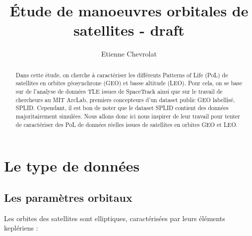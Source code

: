\documentclass{article}
\title{Étude de manoeuvres orbitales de satellites - draft}
\author{Etienne Chevrolat}
\date{}
\begin{document}
\maketitle

\begin{abstract}
    Dans cette étude, on cherche à caractériser les différents Patterns of Life (PoL) de satellites en orbites géosynchrone (GEO) et basse altitude (LEO).
    Pour cela, on se base sur de l'analyse de données TLE issues de SpaceTrack ainsi que sur le travail de chercheurs au MIT ArcLab, premiers concepteurs d'un dataset public GEO labellisé, SPLID.
    Cependant, il est bon de noter que le dataset SPLID contient des données majoritairement simulées. Nous allons donc ici nous inspirer de leur travail pour tenter de caractériser des PoL de données réelles issues de satellites en orbites GEO et LEO.
\end{abstract}

\section{Le type de données }

\subsection{Les paramètres orbitaux}

Les orbites des satellites sont elliptiques, caractérisées par leurs éléments keplériens :

\vspace{0.3cm}
\noindent{}
\vspace{0.5cm}
\end{document}
